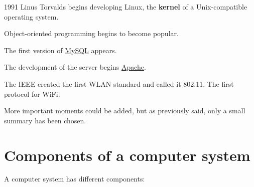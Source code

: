 \begin{description}
    \begin{minipage}{0.8\linewidth}
        \item[1991] Linus Torvalds begins developing Linux, the \textbf{kernel} of a Unix-compatible operating system.
    \end{minipage}
    \hfill
    \begin{minipage}{0.1\linewidth}
        \hfill
        
    \end{minipage}

    \item[1991] Object-oriented programming begins to become popular.

    \item[1995] The first version of \href{https://es.wikipedia.org/wiki/MySQL}{MySQL} appears.

    \item[1995] The development of the server begins \href{https://es.wikipedia.org/wiki/Servidor_HTTP_Apache}{Apache}.

    \item[1997] The IEEE created the first WLAN standard and called it 802.11. The first protocol for WiFi.

\end{description}

More important moments could be added, but as previously said, only a small summary has been chosen.

\section{Components of a computer system}

A computer system has different components:

